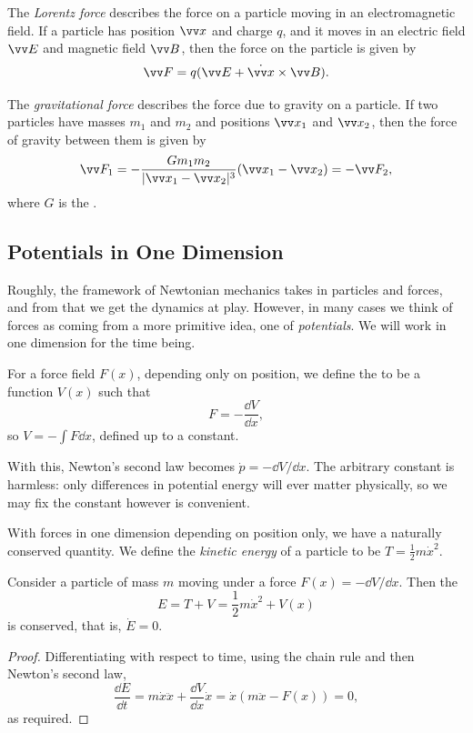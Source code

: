 The \emph{Lorentz force} describes the force on a particle moving in an electromagnetic field. If a particle has position $\vv x$ and charge $q$, and it moves in an electric field $\vv E$ and magnetic field $\vv B$, then the force on the particle is given by
$$
\vv F = q(\vv E + \dot{\vv x} \times \vv B).
$$


The \emph{gravitational force} describes the force due to gravity on a particle. If two particles have masses $m_1$ and $m_2$ and positions $\vv x_1$ and $\vv x_2$, then the force of gravity between them is given by
$$
\vv F_1 = - \frac{G m_1 m_2}{| \vv x_1 - \vv x_2|^3} (\vv x_1 - \vv x_2) = - \vv F_2,
$$
where $G$ is the .


\subsection{Potentials in One Dimension}

Roughly, the framework of Newtonian mechanics takes in particles and forces, and from that we get the dynamics at play. However, in many cases we think of forces as coming from a more primitive idea, one of \emph{potentials}. We will work in one dimension for the time being.

\begin{definition}
	For a force field $F(x)$, depending only on position, we define the  to be a function $V(x)$ such that
	$$
	F = - \frac{\dd V}{\dd x},
	$$
	so $V = -\int F \dd x$, defined up to a constant.
\end{definition}

With this, Newton's second law becomes $\dot{p} = -\dd V/\dd x$. The arbitrary constant is harmless: only differences in potential energy will ever matter physically, so we may fix the constant however is convenient.

With forces in one dimension depending on position only, we have a naturally conserved quantity. We define the \emph{kinetic energy} of a particle to be $T = \frac{1}{2}m \dot{x}^2$.

\begin{proposition}
	Consider a particle of mass $m$ moving under a force $F(x) = -\dd V/\dd x$. Then the 
	$$
	E = T + V = \frac{1}{2}m\dot{x}^2 + V(x)
	$$
	is conserved, that is, $\dot{E} = 0$.
\end{proposition}
\begin{proof}
	Differentiating with respect to time, using the chain rule and then Newton's second law,
	$$
	\frac{\dd E}{\dd t} = m \dot{x} \ddot{x} + \frac{\dd V}{\dd x}\dot{x} = \dot{x}\left(m \ddot{x} - F(x)\right) = 0,
	$$
	as required.
\end{proof}

